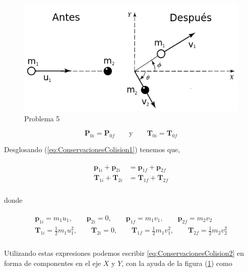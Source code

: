 \documentclass[a4paper,10pt]{article}
\begin{document}
\begin{figure}[ht]
 \centering
\includegraphics[scale=0.5]{problema5fig1}
\caption{Problema 5}
\label{fig:problema5}
\end{figure}


\begin{equation}
 \mathbf{P}_{0i} = \mathbf{P}_{0f} \qquad \text{y} \qquad \mathbf{T}_{0i} = \mathbf{T}_{0f}
 \label{eq:ConservacionesColision1}
\end{equation}

Desglosando (\ref{eq:ConservacionesColision1}) tenemos que,

\begin{gather}
 \begin{split}
  \mathbf{p}_{1i} +  \mathbf{p}_{2i} &=   \mathbf{p}_{1f} +  \mathbf{p}_{2f} \\
  \mathbf{T}_{1i} +  \mathbf{T}_{2i} &=   \mathbf{T}_{1f} +  \mathbf{T}_{2f} \\
 \label{eq:ConservacionesColision2}
 \end{split}
\end{gather}

donde

\begin{gather*}
 \begin{split}
%
\mathbf{p}_{1i} = m_1 u_1, \qquad \mathbf{p}_{2i} = 0, \qquad \mathbf{p}_{1f} = m_1 v_1, \qquad \mathbf{p}_{2f} = m_2 v_2 \\
%
\mathbf{T}_{1i} = \frac{1}{2} m_1 u_1^2, \qquad \mathbf{T}_{2i} = 0, \qquad \mathbf{T}_{1f} = \frac{1}{2} m_1 v_1^2, \qquad \mathbf{T}_{2f} = \frac{1}{2} m_2 v_2^2 \\
%
 \end{split}
\end{gather*}

Utilizando estas expresiones podemos escribir \ref{eq:ConservacionesColision2} en forma de componentes
en el eje $X$ y $Y$, con la ayuda de la figura (\ref{fig:problema5}) como
\end{document}
